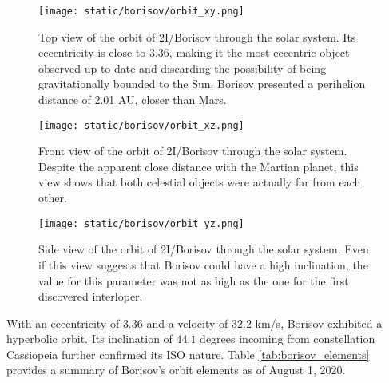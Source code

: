\begin{figure}[H]
  \centering
  \texttt{[image: static/borisov/orbit\_xy.png]}
  \caption[Top view of the orbit of 2I/Borisov through the solar system]{
    Top view of the orbit of 2I/Borisov through the solar system. Its eccentricity is
    close to 3.36, making it the most eccentric object observed up to date
    and discarding the possibility of being gravitationally bounded to the Sun.
    Borisov presented a perihelion distance of 2.01 AU, closer than Mars.
  }
  \label{fig:borisov_orbit}
\end{figure}


\begin{figure}[H]
  \centering
  \texttt{[image: static/borisov/orbit\_xz.png]}
  \caption[Front view of the orbit of 2I/Borisov through the solar system]{
    Front view of the orbit of 2I/Borisov through the solar system. Despite the
    apparent close distance with the Martian planet, this view shows that both
    celestial objects were actually far from each other.}
  \label{fig:borisov_orbit_xz}
\end{figure}

\begin{figure}[H]
  \centering
  \texttt{[image: static/borisov/orbit\_yz.png]}
  \caption[Side view of the orbit of 2I/Borisov through the solar system]{
    Side view of the orbit of 2I/Borisov through the solar system. Even if this
    view suggests that Borisov could have a high inclination, the value for this
    parameter was not as high as the one for the first discovered interloper.}
  \label{fig:borisov_orbit_yz}
\end{figure}

With an eccentricity of $3.36$ and a velocity of $32.2$ km/s, Borisov exhibited
a hyperbolic orbit. Its inclination of $44.1$ degrees incoming from
constellation Cassiopeia further confirmed its ISO nature. Table
\ref{tab:borisov_elements} provides a summary of Borisov's orbit elements as of
August 1, 2020.

